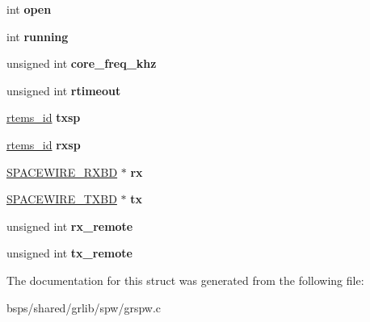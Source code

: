 \begin{DoxyCompactItemize}
int {\bfseries open}
\item 
\mbox{\label{structGRSPW__DEV_a31369006b68f82a9bf6ab0495bd88876}} 
int {\bfseries running}
\item 
\mbox{\label{structGRSPW__DEV_a4ceb1e2aacb90b585a0c3e4174c0e032}} 
unsigned int {\bfseries core\+\_\+freq\+\_\+khz}
\item 
\mbox{\label{structGRSPW__DEV_a749ee8b8ea6a5738963083bfdb8a2b3d}} 
unsigned int {\bfseries rtimeout}
\item 
\mbox{\label{structGRSPW__DEV_a185d2ef1c6efe0a37db5f63bc3186eaa}} 
\mbox{\hyperlink{group__ClassicTasks_gab20892b814dced7dd4e5b9bf42becd57}{rtems\+\_\+id}} {\bfseries txsp}
\item 
\mbox{\label{structGRSPW__DEV_a738dbd19953d8b407aaf297c23c60fee}} 
\mbox{\hyperlink{group__ClassicTasks_gab20892b814dced7dd4e5b9bf42becd57}{rtems\+\_\+id}} {\bfseries rxsp}
\item 
\mbox{\label{structGRSPW__DEV_a3f82313d65c4a3cb1c076c4db926b1e7}} 
\mbox{\hyperlink{structSPACEWIRE__RXBD}{S\+P\+A\+C\+E\+W\+I\+R\+E\+\_\+\+R\+X\+BD}} $\ast$ {\bfseries rx}
\item 
\mbox{\label{structGRSPW__DEV_a605747d1d290e18e3197bf9d818ff2ac}} 
\mbox{\hyperlink{structSPACEWIRE__TXBD}{S\+P\+A\+C\+E\+W\+I\+R\+E\+\_\+\+T\+X\+BD}} $\ast$ {\bfseries tx}
\item 
\mbox{\label{structGRSPW__DEV_af16edbed4deee2cdbc44c3948d8b6e5e}} 
unsigned int {\bfseries rx\+\_\+remote}
\item 
\mbox{\label{structGRSPW__DEV_a2cb5b0984f8dcec97bcff5f110975987}} 
unsigned int {\bfseries tx\+\_\+remote}
\end{DoxyCompactItemize}


The documentation for this struct was generated from the following file\+:\begin{DoxyCompactItemize}
\item 
bsps/shared/grlib/spw/grspw.\+c\end{DoxyCompactItemize}

